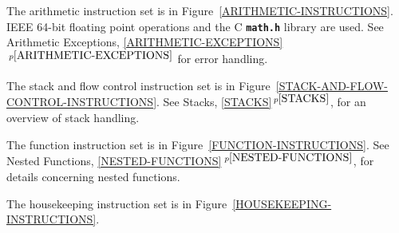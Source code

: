 \documentclass[12pt]{article}
\newcommand{\TT}[1]{{\tt \bfseries #1}}
\newcommand{\itemref}[1]{\ref{#1}$\,^{p\pageref{#1}}$}
\newlength{\figurewidth}
\newenvironment{boxedfigure}[1][!btp]%
	{\begin{figure*}[#1]
	 \begin{lrbox}{\figurebox}
	 \begin{minipage}{\figurewidth}

	 \vspace*{1ex}}%
	{
	 \vspace*{1ex}

	 \end{minipage}
	 \end{lrbox}

	 \centering
	 \fbox{\hspace*{0.1in}\usebox{\figurebox}\hspace*{0.1in}}
	 \end{figure*}}
\begin{document}
The arithmetic instruction set is in Figure~\ref{ARITHMETIC-INSTRUCTIONS}.
IEEE 64-bit floating point operations and the C \TT{math.h}
library are used.  See Arithmetic Exceptions,
\itemref{ARITHMETIC-EXCEPTIONS} for error
handling.

The stack and flow control instruction set is in
Figure~\ref{STACK-AND-FLOW-CONTROL-INSTRUCTIONS}.
See Stacks, \itemref{STACKS}, for an overview of stack handling.

The function instruction set is in
Figure~\ref{FUNCTION-INSTRUCTIONS}.
See Nested Functions, \itemref{NESTED-FUNCTIONS},
for details concerning nested functions.

The housekeeping instruction set is in
Figure~\ref{HOUSEKEEPING-INSTRUCTIONS}.

\pagebreak


\begin{boxedfigure}


\end{boxedfigure}
\end{document}
